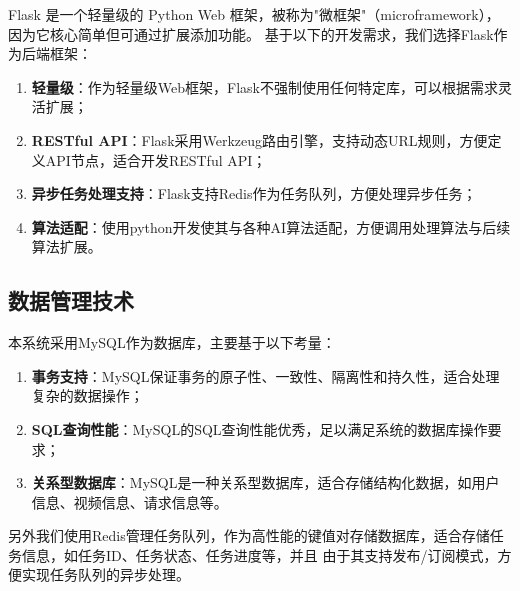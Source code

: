 Flask \cite{flask}是一个轻量级的 Python Web 框架，被称为"微框架"（microframework），因为它核心简单但可通过扩展添加功能。
基于以下的开发需求，我们选择Flask作为后端框架：
\begin{enumerate}
    \item \textbf{轻量级}：作为轻量级Web框架，Flask不强制使用任何特定库，可以根据需求灵活扩展；
    \item \textbf{RESTful API}：Flask采用Werkzeug路由引擎，支持动态URL规则，方便定义API节点，适合开发RESTful API；
    \item \textbf{异步任务处理支持}：Flask支持Redis作为任务队列，方便处理异步任务；
    \item \textbf{算法适配}：使用python开发使其与各种AI算法适配，方便调用处理算法与后续算法扩展。
\end{enumerate}

\subsection{数据管理技术}

本系统采用MySQL作为数据库，主要基于以下考量：
\begin{enumerate}
    \item \textbf{事务支持}：MySQL保证事务的原子性、一致性、隔离性和持久性，适合处理复杂的数据操作；
    \item \textbf{SQL查询性能}：MySQL的SQL查询性能优秀，足以满足系统的数据库操作要求；
    \item \textbf{关系型数据库}：MySQL是一种关系型数据库，适合存储结构化数据，如用户信息、视频信息、请求信息等。
\end{enumerate}

另外我们使用Redis\cite{redis}管理任务队列，作为高性能的键值对存储数据库，适合存储任务信息，如任务ID、任务状态、任务进度等，并且
由于其支持发布/订阅模式，方便实现任务队列的异步处理。